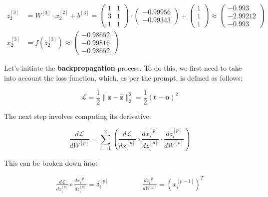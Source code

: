 \documentclass[12pt]{article}
\begin{document}
\begin{enumerate}[leftmargin=\labelsep]
\begin{align*}
                z^{[3]}_2 &= {W}^{[3]} \cdot {x}^{[2]}_2 + {b}^{[3]} = \begin{pmatrix} 1 & 1 \\ 3 & 1 \\ 1 & 1\end{pmatrix} \cdot  \begin{pmatrix} -0.99956 \\ -0.99343\end{pmatrix} +
                \begin{pmatrix} 1 \\ 1 \\ 1\end{pmatrix} \approx \begin{pmatrix} -0.993 \\ -2.99212 \\ -0.993\end{pmatrix} \\
                {x}^{[3]}_2 &= f\left({z}^{[3]}_2\right) \approx \begin{pmatrix} -0.98652 \\ -0.99816 \\ -0.98652\end{pmatrix}
            \end{align*}
            \endgroup

          Let's initiate the \textbf{backpropagation} process. To do this, we first need to take into account the loss function, which, as per the prompt, is defined as follows:

          \begin{equation}\label{ex2-loss}
            \mathcal{L} = \frac{1}{2} \|\mathbf{z} - \hat{\mathbf{z}}\|^{2}_{2} = \frac{1}{2} \left(\mathbf{t} - {\mathbf{o}}\right)^{2}
          \end{equation}

          The next step involves computing its derivative:

          \begin{equation}
            \frac{d\mathcal{L}}{dW^{[p]}} = \sum_{i=1}^{2} \left(\frac{d\mathcal{L}}{dx^{[p]}_i} \circ \frac{dx^{[p]}_i}{dz^{[p]}_i} \cdot \frac{dz^{[p]}_i}{dW^{[p]}} \right)
          \end{equation}

          This can be broken down into:

          \vskip -0.3cm
          \begin{align*}
              \frac{d\mathcal{L}}{dx^{[p]}_i} \circ \frac{dx^{[p]}_i}{dz^{[p]}_i} = \delta^{[p]}_i & \qquad\qquad
              \frac{dz^{[p]}_i}{dW^{[p]}} = \left(x^{[p-1]}_i\right)^{T}
          \end{align*}


\end{enumerate}
\end{document}
